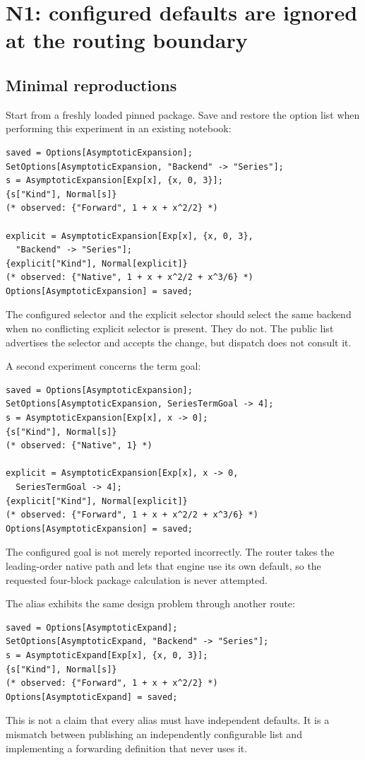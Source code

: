 \documentclass[11pt,a4paper]{article}
\newcommand{\code}[1]{\texttt{\detokenize{#1}}}
\begin{document}
\section{N1: configured defaults are ignored at the routing boundary}
\label{sec:n1}

\subsection{Minimal reproductions}

Start from a freshly loaded pinned package. Save and restore the option list when performing this experiment in an existing notebook:
\begin{lstlisting}
saved = Options[AsymptoticExpansion];
SetOptions[AsymptoticExpansion, "Backend" -> "Series"];
s = AsymptoticExpansion[Exp[x], {x, 0, 3}];
{s["Kind"], Normal[s]}
(* observed: {"Forward", 1 + x + x^2/2} *)

explicit = AsymptoticExpansion[Exp[x], {x, 0, 3},
  "Backend" -> "Series"];
{explicit["Kind"], Normal[explicit]}
(* observed: {"Native", 1 + x + x^2/2 + x^3/6} *)
Options[AsymptoticExpansion] = saved;
\end{lstlisting}
The configured selector and the explicit selector should select the same backend when no conflicting explicit selector is present. They do not. The public \code{Options} list advertises the selector and \code{SetOptions} accepts the change, but dispatch does not consult it.

A second experiment concerns the term goal:
\begin{lstlisting}
saved = Options[AsymptoticExpansion];
SetOptions[AsymptoticExpansion, SeriesTermGoal -> 4];
s = AsymptoticExpansion[Exp[x], x -> 0];
{s["Kind"], Normal[s]}
(* observed: {"Native", 1} *)

explicit = AsymptoticExpansion[Exp[x], x -> 0,
  SeriesTermGoal -> 4];
{explicit["Kind"], Normal[explicit]}
(* observed: {"Forward", 1 + x + x^2/2 + x^3/6} *)
Options[AsymptoticExpansion] = saved;
\end{lstlisting}
The configured goal is not merely reported incorrectly. The router takes the leading-order native path and lets that engine use its own default, so the requested four-block package calculation is never attempted.

The alias exhibits the same design problem through another route:
\begin{lstlisting}
saved = Options[AsymptoticExpand];
SetOptions[AsymptoticExpand, "Backend" -> "Series"];
s = AsymptoticExpand[Exp[x], {x, 0, 3}];
{s["Kind"], Normal[s]}
(* observed: {"Forward", 1 + x + x^2/2} *)
Options[AsymptoticExpand] = saved;
\end{lstlisting}
This is not a claim that every alias must have independent defaults. It is a mismatch between publishing an independently configurable \code{Options[AsymptoticExpand]} list and implementing a forwarding definition that never uses it.
\end{document}
